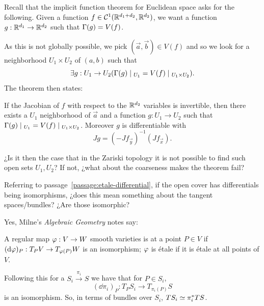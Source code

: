 \documentclass[12pt]{memoir}
\newcounter{passage}
\begin{document}
\begin{ptcb}

Recall that the implicit function theorem for Euclidean space asks for the following. Given a function \(f\in\mathcal{C}^1(\mathbb{R}^{d_1+d_2},\mathbb{R}^{d_2})\), we want a function \(g:\mathbb{R}^{d_1}\to\mathbb{R}^{d_2}\) such that \(\Gamma(g)=V(f)\).\par
As this is not globally possible, we pick \((\vec{a},\vec{b})\in V(f)\) and so we look for a neighborhood \(U_1\times U_2\) of \((a,b)\) such that 
\[
\exists g:U_1\to U_2(\Ga(g)\mid_{U_1}=V(f)\mid_{U_1\x U_2}).
\]
The theorem then states:
\begin{nonum-Th}
    If the Jacobian of \(f\) with respect to the \(\mathbb{R}^{d_2}\) variables is invertible, then there exists a \(U_1\) neighborhood of \(\vec{a}\) and a function \(g:U_1\to U_2\) such that \(\Ga(g)\mid_{U_1}=V(f)\mid_{U_1\x U_2}\). Moreover \(g\) is differentiable with
    \[
    Jg=(-Jf_{\vec{y}})^{-1}(Jf_{\vec{x}}).
    \]
\end{nonum-Th}

\begin{Qn}
    ¿Is it then the case that in the Zariski topology it is not possible to find such open sets \(U_1,U_2\)? If not, ¿what about the coarseness makes the theorem fail?
\end{Qn}
\tcbline
{}
\end{ptcb}

\begin{ptcb}
\begin{Qn}
    Referring to passage~\ref{passage:etale-differential}, if the open cover has differentials being isomorphisms, ¿does this mean something about the tangent spaces/bundles? ¿Are those isomorphic?
\end{Qn}
\tcbline
Yes, Milne's \emph{Algebraic Geometry} notes \cite[Definition~5.44, p.~118]{notes:milne-ag} say:

\begin{nonum-Def}
A regular map \(\varphi:V\to W\) smooth varieties is  at a point \(P\in V\) if \((\dd\varphi)_P:T_PV\to T_{\varphi(P)}W\) is an isomorphism; \(\varphi\) is étale if it is étale at all points of \(V\).
\end{nonum-Def}

Following this for a \(S_i\xrightarrow{\pi_i}S\) we have that for \(P\in S_i\),
\[
(\dd\pi_i)_P:T_PS_i\to T_{\pi_i(P)}S
\]
is an isomorphism. So, in terms of bundles over \(S_i\), \(TS_i\simeq \pi_i^\ast TS\).
\end{ptcb}
\end{document}
